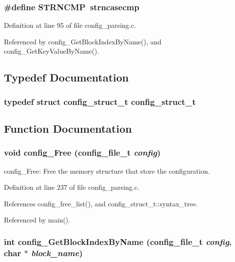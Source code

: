 \subsubsection{\setlength{\rightskip}{0pt plus 5cm}\#define STRNCMP\ strncasecmp}\label{config__parsing_8c_a0}




Definition at line 95 of file config\_\-parsing.c.

Referenced by config\_\-Get\-Block\-Index\-By\-Name(), and config\_\-Get\-Key\-Value\-By\-Name().

\subsection{Typedef Documentation}
\subsubsection{\setlength{\rightskip}{0pt plus 5cm}typedef struct {\bf config\_\-struct\_\-t}  {\bf config\_\-struct\_\-t}}\label{config__parsing_8c_a1}




\subsection{Function Documentation}
\subsubsection{\setlength{\rightskip}{0pt plus 5cm}void config\_\-Free (config\_\-file\_\-t {\em config})}\label{config__parsing_8c_a9}


config\_\-Free: Free the memory structure that store the configuration. 

Definition at line 237 of file config\_\-parsing.c.

References config\_\-free\_\-list(), and config\_\-struct\_\-t::syntax\_\-tree.

Referenced by main().
\subsubsection{\setlength{\rightskip}{0pt plus 5cm}int config\_\-Get\-Block\-Index\-By\-Name (config\_\-file\_\-t {\em config}, char $\ast$ {\em block\_\-name})}\label{config__parsing_8c_a12}



